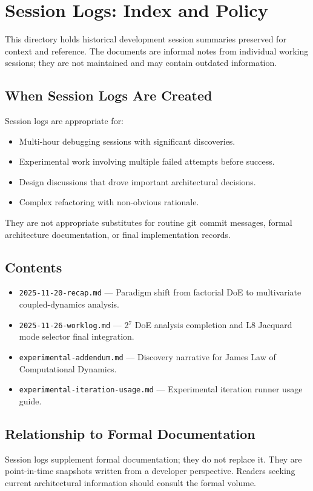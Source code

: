 
\section{Session Logs: Index and Policy}

This directory holds historical development session summaries preserved for
context and reference. The documents are informal notes from individual
working sessions; they are not maintained and may contain outdated
information.

\subsection{When Session Logs Are Created}

Session logs are appropriate for:
\begin{itemize}
  \item Multi-hour debugging sessions with significant discoveries.
  \item Experimental work involving multiple failed attempts before success.
  \item Design discussions that drove important architectural decisions.
  \item Complex refactoring with non-obvious rationale.
\end{itemize}

They are not appropriate substitutes for routine git commit messages,
formal architecture documentation, or final implementation records.

\subsection{Contents}

\begin{itemize}
  \item \texttt{2025-11-20-recap.md} — Paradigm shift from factorial DoE to
    multivariate coupled-dynamics analysis.
  \item \texttt{2025-11-26-worklog.md} — 2$^7$ DoE analysis completion and
    L8 Jacquard mode selector final integration.
  \item \texttt{experimental-addendum.md} — Discovery narrative for James Law
    of Computational Dynamics.
  \item \texttt{experimental-iteration-usage.md} — Experimental iteration
    runner usage guide.
\end{itemize}

\subsection{Relationship to Formal Documentation}

Session logs supplement formal documentation; they do not replace it. They
are point-in-time snapshots written from a developer perspective. Readers
seeking current architectural information should consult the formal volume.
